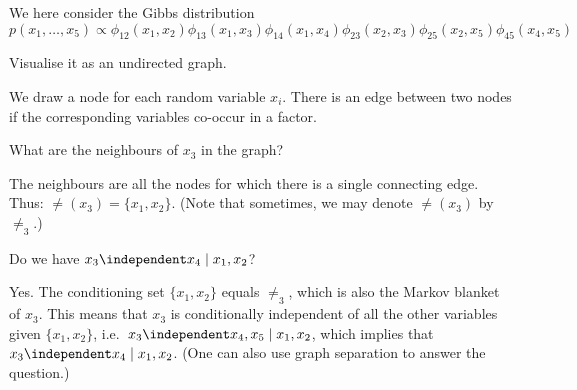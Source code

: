 
\label{ex:visualising-gibbs-distributions}
We here consider the Gibbs distribution
$$p(x_1, \ldots, x_5) \propto \phi_{12}(x_1,x_2)\phi_{13}(x_1,x_3)\phi_{14}(x_1,x_4)\phi_{23}(x_2,x_3)\phi_{25}(x_2,x_5)\phi_{45}(x_4,x_5)$$

\begin{exenumerate}
\item Visualise it as an undirected graph.

  \begin{solution}

   We draw a node for each random variable $x_i$. There is an edge between two nodes if the corresponding variables co-occur in a factor.
\begin{center}
\end{center}

  \end{solution}

\item What are the neighbours of $x_3$ in the graph?

  \begin{solution}
    The neighbours are all the nodes for which there is a single connecting edge. Thus:
    $\ne(x_3) = \{x_1, x_2\}$. (Note that sometimes, we may denote $\ne(x_3)$ by $\ne_3$.)
  \end{solution}

\item Do we have $x_3 \independent x_4 \mid x_1, x_2$?

  \begin{solution}
    Yes. The conditioning set $\{x_1,x_2\}$ equals $\ne_3$, which is also the Markov blanket of  $x_3$. This means that $x_3$ is conditionally independent of all the other variables given $\{x_1,x_2\}$, i.e.\ $x_3 \independent x_4,x_5 \mid x_1, x_2$, which implies that $x_3 \independent x_4 \mid x_1, x_2$. (One can also use graph separation to answer the question.)
  \end{solution}


\end{exenumerate}
